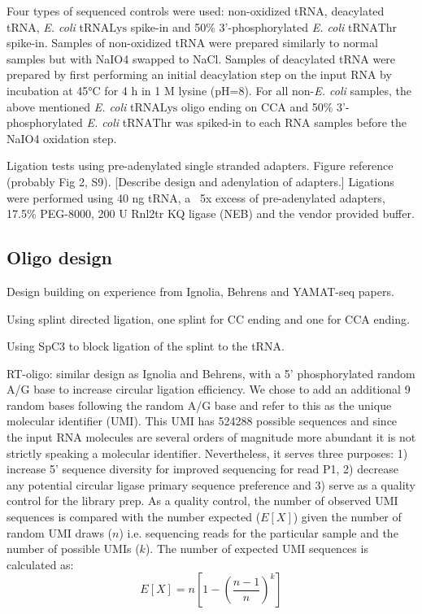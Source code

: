 \documentclass[9pt,lineno]{elife}
\begin{document}
Four types of sequenced controls were used: non-oxidized tRNA, deacylated tRNA, \textit{E. coli} tRNA$\text{Lys}$ spike-in and 50\% 3'-phosphorylated \textit{E. coli} tRNA$\text{Thr}$ spike-in.
Samples of non-oxidized tRNA were prepared similarly to normal samples but with NaIO4 swapped to NaCl.
Samples of deacylated tRNA were prepared by first performing an initial deacylation step on the input RNA by incubation at 45°C for 4 h in 1 M lysine (pH=8).
For all non-\textit{E. coli} samples, the above mentioned \textit{E. coli} tRNA$\text{Lys}$ oligo ending on CCA and 50\% 3'-phosphorylated \textit{E. coli} tRNA$\text{Thr}$ was spiked-in to each RNA samples before the NaIO4 oxidation step.


Ligation tests using pre-adenylated single stranded adapters.
Figure reference (probably Fig 2, S9).
[Describe design and adenylation of adapters.]
Ligations were performed using 40 ng tRNA, a ~5x excess of pre-adenylated adapters, 17.5\% PEG-8000, 200 U Rnl2tr KQ ligase (NEB) and the vendor provided buffer.





\subsection*{Oligo design}
Design building on experience from Ignolia, Behrens and YAMAT-seq papers.

Using splint directed ligation, one splint for CC ending and one for CCA ending.

Using SpC3 to block ligation of the splint to the tRNA.

RT-oligo: similar design as Ignolia and Behrens, with a 5' phosphorylated random A/G base to increase circular ligation efficiency.
We chose to add an additional 9 random bases following the random A/G base and refer to this as the unique molecular identifier (UMI).
This UMI has 524288 possible sequences and since the input RNA molecules are several orders of magnitude more abundant it is not strictly speaking a molecular identifier.
Nevertheless, it serves three purposes: 1) increase 5' sequence diversity for improved sequencing for read P1, 2) decrease any potential circular ligase primary sequence preference and 3) serve as a quality control for the library prep.
As a quality control, the number of observed UMI sequences is compared with the number expected ($E[X]$) given the number of random UMI draws ($n$) i.e. sequencing reads for the particular sample and the number of possible UMIs ($k$).
The number of expected UMI sequences is calculated as:
$$
E[X] = n \left[ 1 - \left(\frac{n-1}{n} \right)^k \right]
$$
\end{document}
